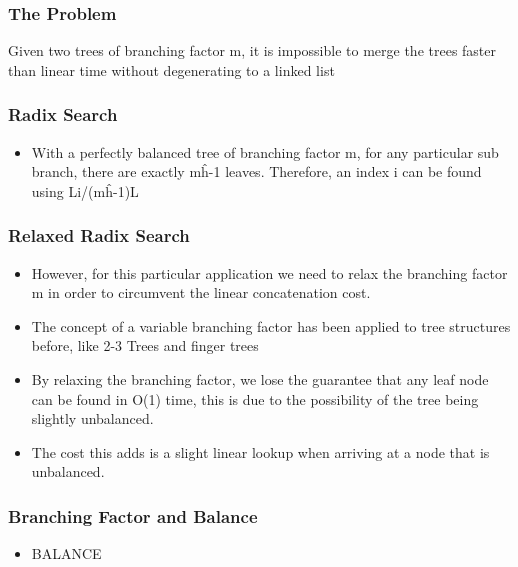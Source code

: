 \documentclass{beamer}
\begin{document}
\begin{frame}
\frametitle{The Problem}

Given two trees of branching factor m, it is impossible to merge the trees faster than linear time without degenerating to a linked list

\end{frame}


\begin{frame}
\frametitle{Radix Search}

	\begin{itemize}
	
		\item With a perfectly balanced tree of branching factor m, for any particular sub branch, there are exactly m\^h-1 leaves. Therefore, an index i can be found using Li/(m\^h-1)L

	
	\end{itemize}

\end{frame}


\begin{frame}
\frametitle{Relaxed Radix Search}

	\begin{itemize}
		\item However, for this particular application we need to relax the branching factor m in order to circumvent the linear concatenation cost.
		\item The concept of a variable branching factor has been applied to tree structures before, like 2-3 Trees and finger trees
		\item By relaxing the branching factor, we lose the guarantee that any leaf node can be found in O(1) time, this is due to the possibility of the tree being slightly unbalanced. 
		\item The cost this adds is a slight linear lookup when arriving at a node that is unbalanced.
	
	\end{itemize}

\end{frame}

\begin{frame}
\frametitle{Branching Factor and Balance}

	\begin{itemize}
		\item BALANCE
	
	\end{itemize}

\end{frame}
 
\end{document}
